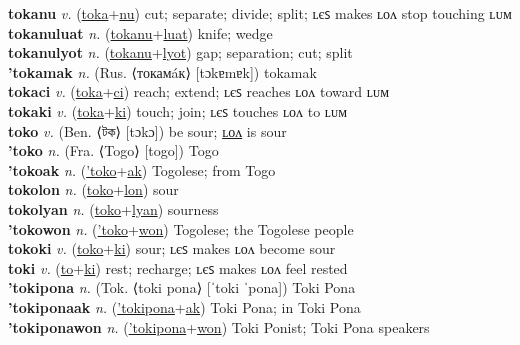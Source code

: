 \textbf{tokanu} \textit{v.} (\hyperref[toka]{toka}+\hyperref[nu]{nu})
cut; separate; divide; split; ʟєꜱ makes ʟᴏᴧ stop touching ʟᴜᴍ \label{tokanu} \\
\textbf{tokanuluat} \textit{n.} (\hyperref[tokanu]{tokanu}+\hyperref[luat]{luat})
knife; wedge \label{tokanuluat} \\
\textbf{tokanulyot} \textit{n.} (\hyperref[tokanu]{tokanu}+\hyperref[lyot]{lyot})
gap; separation; cut; split \label{tokanulyot} \\
\textbf{'tokamak} \textit{n.} (Rus. ⟨токамáк⟩ [tɔkɐmɐk])
tokamak \label{'tokamak} \\
\textbf{tokaci} \textit{v.} (\hyperref[toka]{toka}+\hyperref[ci]{ci})
reach; extend; ʟєꜱ reaches ʟᴏᴧ toward ʟᴜᴍ \label{tokaci} \\
\textbf{tokaki} \textit{v.} (\hyperref[toka]{toka}+\hyperref[ki]{ki})
touch; join; ʟєꜱ touches ʟᴏᴧ to ʟᴜᴍ \label{tokaki} \\
\textbf{toko} \textit{v.} (Ben. ⟨টক⟩ [tɔkɔ])
be sour; \hyperref[tokolon]{ʟᴏᴧ} is sour \label{toko} \\
\textbf{'toko} \textit{n.} (Fra. ⟨Togo⟩ [togo])
Togo \label{'toko} \\
\textbf{'tokoak} \textit{n.} (\hyperref['toko]{'toko}+\hyperref[ak]{ak})
Togolese; from Togo \label{'tokoak} \\
\textbf{tokolon} \textit{n.} (\hyperref[toko]{toko}+\hyperref[lon]{lon})
sour \label{tokolon} \\
\textbf{tokolyan} \textit{n.} (\hyperref[toko]{toko}+\hyperref[lyan]{lyan})
sourness \label{tokolyan} \\
\textbf{'tokowon} \textit{n.} (\hyperref['toko]{'toko}+\hyperref[won]{won})
Togolese; the Togolese people \label{'tokowon} \\
\textbf{tokoki} \textit{v.} (\hyperref[toko]{toko}+\hyperref[ki]{ki})
sour; ʟєꜱ makes ʟᴏᴧ become sour \label{tokoki} \\
\textbf{toki} \textit{v.} (\hyperref[to]{to}+\hyperref[ki]{ki})
rest; recharge; ʟєꜱ makes ʟᴏᴧ feel rested \label{toki} \\
\textbf{'tokipona} \textit{n.} (Tok. ⟨toki pona⟩ [ˈtoki ˈpona])
Toki Pona \label{'tokipona} \\
\textbf{'tokiponaak} \textit{n.} (\hyperref['tokipona]{'tokipona}+\hyperref[ak]{ak})
Toki Pona; in Toki Pona \label{'tokiponaak} \\
\textbf{'tokiponawon} \textit{n.} (\hyperref['tokipona]{'tokipona}+\hyperref[won]{won})
Toki Ponist; Toki Pona speakers \label{'tokiponawon} \\

